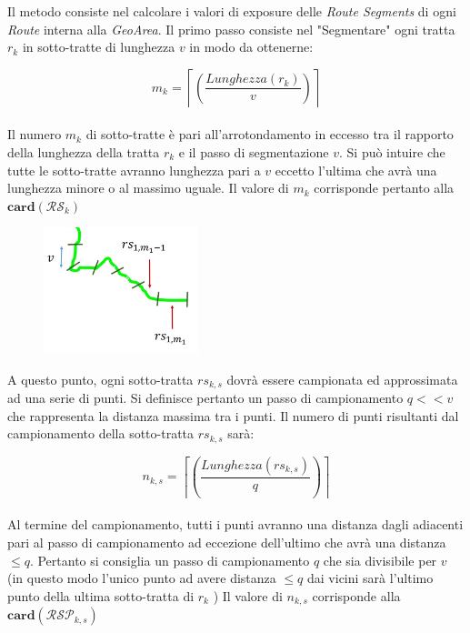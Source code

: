 \noindent Il metodo consiste nel calcolare i valori di exposure delle \textit{Route Segments} di ogni \textit{Route} interna alla \textit{GeoArea}.
Il primo passo consiste nel "Segmentare" ogni tratta $r_k$ in sotto-tratte di lunghezza $v$ in modo da ottenerne:

\begin{equation}\label{eq:numerotratte}
m_{k}=\left\lceil\left(\frac{Lunghezza(r_k)}{v}\right)\right\rceil
\end{equation}
\\
Il numero $m_{k}$ di sotto-tratte è pari all'arrotondamento in eccesso tra il rapporto della lunghezza della tratta $r_k$ e il passo di segmentazione $v$. Si può intuire che tutte le sotto-tratte avranno lunghezza pari a $v$ eccetto l'ultima che avrà una lunghezza minore o al massimo uguale. Il valore di $m_k$ corrisponde pertanto alla $\mathbf{card}(\mathcal{RS}_{k})$
\\


	\begin{figure}[h]
	\centering
	\includegraphics[width=0.4\textwidth]{images/routes2}
	\caption{}
	\label{img:segment}
	\end{figure}

\noindent A questo punto, ogni sotto-tratta $rs_{k,s}$ dovrà essere campionata ed approssimata ad una serie di punti. Si definisce pertanto un passo di campionamento $q << v$ che rappresenta la distanza massima tra i punti. Il numero di punti risultanti dal campionamento della sotto-tratta $rs_{k,s}$ sarà:

\begin{equation}\label{eq:numerotratte}
n_{k,s}=\left\lceil\left(\frac{Lunghezza(rs_{k,s})}{q}\right)\right\rceil
\end{equation}
\\
Al termine del campionamento, tutti i punti avranno una distanza dagli adiacenti pari al passo di campionamento ad eccezione dell'ultimo che avrà una distanza $\le q$. Pertanto si consiglia un passo di campionamento $q$ che sia divisibile per $v$ (in questo modo l'unico punto ad avere distanza $\le q$ dai vicini sarà l'ultimo punto della ultima sotto-tratta di $r_k$ ) Il valore di $n_{k,s}$ corrisponde alla $\mathbf{card}(\mathcal{RSP}_{k,s})$
\\

